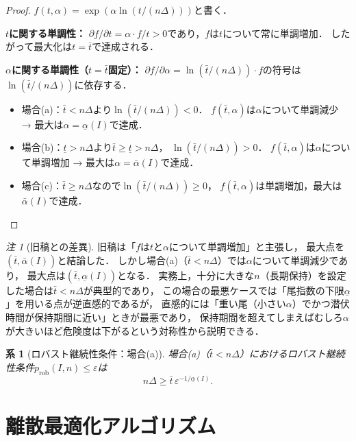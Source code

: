 \documentclass[12pt,a4paper]{article}
\theoremstyle{plain}
\newtheorem{corollary}[theorem]{系}
\theoremstyle{definition}
\theoremstyle{remark}
\newtheorem{remark}[theorem]{注}
\begin{document}
\begin{proof}
$f(t,\alpha) = \exp(\alpha \ln(t/(n\Delta)))$と書く．

\textbf{$t$に関する単調性：}
$\partial f/\partial t = \alpha \cdot f / t > 0$であり，$f$は$t$について常に単調増加．
したがって最大化は$t = \bar{t}$で達成される．

\textbf{$\alpha$に関する単調性（$t = \bar{t}$固定）：}
$\partial f/\partial \alpha = \ln(\bar{t}/(n\Delta)) \cdot f$の符号は$\ln(\bar{t}/(n\Delta))$に依存する．

\begin{itemize}
  \item 場合(a)：$\bar{t} < n\Delta$より$\ln(\bar{t}/(n\Delta)) < 0$．
    $f(\bar{t},\alpha)$は$\alpha$について単調減少 → 最大は$\alpha = \underline{\alpha}(I)$で達成．
  \item 場合(b)：$\underline{t} > n\Delta$より$\bar{t} \ge \underline{t} > n\Delta$，
    $\ln(\bar{t}/(n\Delta)) > 0$．
    $f(\bar{t},\alpha)$は$\alpha$について単調増加 → 最大は$\alpha = \bar{\alpha}(I)$で達成．
  \item 場合(c)：$\bar{t} \ge n\Delta$なので$\ln(\bar{t}/(n\Delta)) \ge 0$，
    $f(\bar{t},\alpha)$は単調増加，最大は$\bar{\alpha}(I)$で達成．
\end{itemize}
\end{proof}

\begin{remark}[旧稿との差異]
旧稿は「$f$は$t$と$\alpha$について単調増加」と主張し，
最大点を$(\bar{t}, \bar{\alpha}(I))$と結論した．
しかし場合(a)（$\bar{t} < n\Delta$）では$\alpha$について単調減少であり，
最大点は$(\bar{t}, \underline{\alpha}(I))$となる．
実務上，十分に大きな$n$（長期保持）を設定した場合は$\bar{t} < n\Delta$が典型的であり，
この場合の最悪ケースでは「尾指数の下限$\underline{\alpha}$」を用いる点が逆直感的であるが，
直感的には「重い尾（小さい$\alpha$）でかつ潜伏時間が保持期間に近い」ときが最悪であり，
保持期間を超えてしまえばむしろ$\alpha$が大きいほど危険度は下がるという対称性から説明できる．
\end{remark}

\begin{corollary}[ロバスト継続性条件：場合(a)]\label{cor:robust_condition}
場合(a)（$\bar{t} < n\Delta$）におけるロバスト継続性条件$p_{\mathrm{rob}}(I,n) \le \varepsilon$は
\[
  n\Delta \ge \bar{t}\,\varepsilon^{-1/\underline{\alpha}(I)}.
\]
\end{corollary}

\section{離散最適化アルゴリズム}
\label{sec:algorithm}
\end{document}
